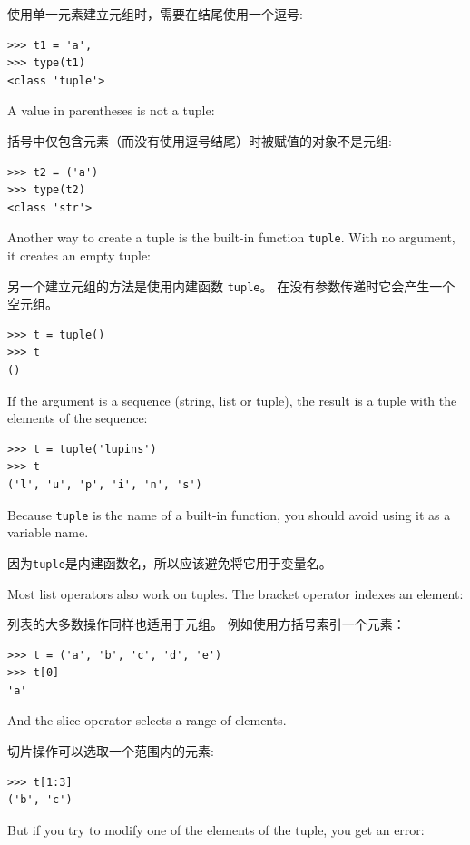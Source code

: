 使用单一元素建立元组时，需要在结尾使用一个逗号:


\begin{lstlisting}
>>> t1 = 'a',
>>> type(t1)
<class 'tuple'>
\end{lstlisting}
%
A value in parentheses is not a tuple:

括号中仅包含元素（而没有使用逗号结尾）时被赋值的对象不是元组:

\begin{lstlisting}
>>> t2 = ('a')
>>> type(t2)
<class 'str'>
\end{lstlisting}
%
Another way to create a tuple is the built-in function {\tt tuple}.
With no argument, it creates an empty tuple:

另一个建立元组的方法是使用内建函数 \lstinline{tuple}。 在没有参数传递时它会产生一个空元组。

\begin{lstlisting}
>>> t = tuple()
>>> t
()
\end{lstlisting}

%
If the argument is a sequence (string, list or tuple), the result
is a tuple with the elements of the sequence:



\begin{verbatim}
>>> t = tuple('lupins')
>>> t
('l', 'u', 'p', 'i', 'n', 's')
\end{verbatim}
%
Because {\tt tuple} is the name of a built-in function, you should
avoid using it as a variable name.

因为\lstinline{tuple}是内建函数名，所以应该避免将它用于变量名。


Most list operators also work on tuples.  The bracket operator
indexes an element:

列表的大多数操作同样也适用于元组。 例如使用方括号索引一个元素：


\begin{lstlisting}
>>> t = ('a', 'b', 'c', 'd', 'e')
>>> t[0]
'a'
\end{lstlisting}
%
And the slice operator selects a range of elements.

切片操作可以选取一个范围内的元素:

\begin{lstlisting}
>>> t[1:3]
('b', 'c')
\end{lstlisting}
%
But if you try to modify one of the elements of the tuple, you get
an error:

